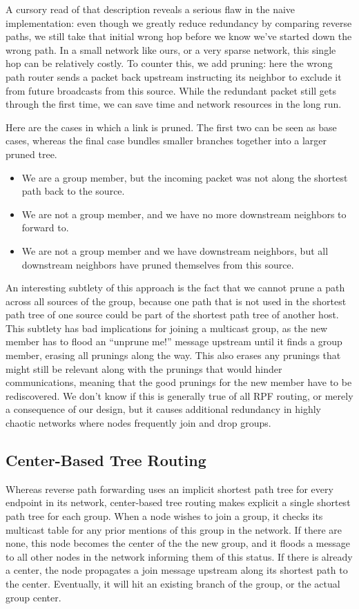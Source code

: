 \documentclass[11pt]{article}
\begin{document}
      A cursory read of that description reveals a serious flaw in the naive implementation: even though we greatly reduce redundancy by comparing reverse paths, we still take that initial wrong hop before we know we've started down the wrong path. In a small network like ours, or a very sparse network, this single hop can be relatively costly. To counter this, we add pruning: here the wrong path router sends a packet back upstream instructing its neighbor to exclude it from future broadcasts from this source. While the redundant packet still gets through the first time, we can save time and network resources in the long run.
      
      Here are the cases in which a link is pruned. The first two can be seen as base cases, whereas the final case bundles smaller branches together into a larger pruned tree.
      \begin{itemize}
        \item We are a group member, but the incoming packet was not along the shortest path back to the source.
        \item We are not a group member, and we have no more downstream neighbors to forward to.
        \item We are not a group member and we have downstream neighbors, but all downstream neighbors have pruned themselves from this source.
      \end{itemize}
      
      An interesting subtlety of this approach is the fact that we cannot prune a path across all sources of the group, because one path that is not used in the shortest path tree of one source could be part of the shortest path tree of another host. This subtlety has bad implications for joining a multicast group, as the new member has to flood an ``unprune me!'' message upstream until it finds a group member, erasing all prunings along the way. This also erases any prunings that might still be relevant along with the prunings that would hinder communications, meaning that the good prunings for the new member have to be rediscovered. We don't know if this is generally true of all RPF routing, or merely a consequence of our design, but it causes additional redundancy in highly chaotic networks where nodes frequently join and drop groups.
      
    \subsection{Center-Based Tree Routing}
      Whereas reverse path forwarding uses an implicit shortest path tree for every endpoint in its network, center-based tree routing makes explicit a single shortest path tree for each group. When a node wishes to join a group, it checks its multicast table for any prior mentions of this group in the network. If there are none, this node becomes the center of the the new group, and it floods a message to all other nodes in the network informing them of this status. If there is already a center, the node propagates a join message upstream along its shortest path to the center. Eventually, it will hit an existing branch of the group, or the actual group center.
      
\end{document}
